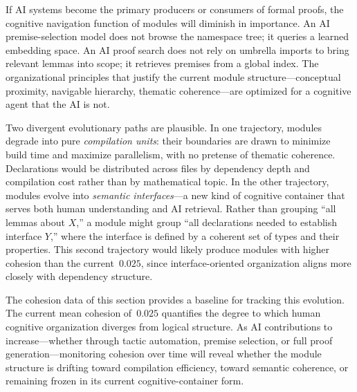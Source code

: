 If AI systems become the primary producers or consumers of formal proofs, the cognitive navigation function of modules will diminish in importance. An AI premise-selection model does not browse the namespace tree; it queries a learned embedding space. An AI proof search does not rely on umbrella imports to bring relevant lemmas into scope; it retrieves premises from a global index. The organizational principles that justify the current module structure---conceptual proximity, navigable hierarchy, thematic coherence---are optimized for a cognitive agent that the AI is not.

Two divergent evolutionary paths are plausible. In one trajectory, modules degrade into pure \emph{compilation units}: their boundaries are drawn to minimize build time and maximize parallelism, with no pretense of thematic coherence. Declarations would be distributed across files by dependency depth and compilation cost rather than by mathematical topic. In the other trajectory, modules evolve into \emph{semantic interfaces}---a new kind of cognitive container that serves both human understanding and AI retrieval. Rather than grouping ``all lemmas about $X$,'' a module might group ``all declarations needed to establish interface $Y$,'' where the interface is defined by a coherent set of types and their properties. This second trajectory would likely produce modules with higher cohesion than the current~$0.025$, since interface-oriented organization aligns more closely with dependency structure.

The cohesion data of this section provides a baseline for tracking this evolution. The current mean cohesion of~$0.025$ quantifies the degree to which human cognitive organization diverges from logical structure. As AI contributions to  increase---whether through tactic automation, premise selection, or full proof generation---monitoring cohesion over time will reveal whether the module structure is drifting toward compilation efficiency, toward semantic coherence, or remaining frozen in its current cognitive-container form.